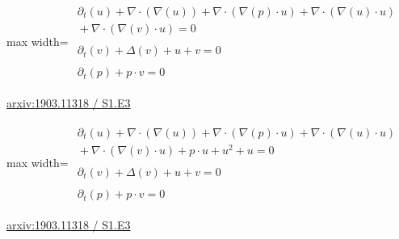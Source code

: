 \documentclass[10pt,a4paper]{article}
\begin{document}
\begin{minipage}{\linewidth}
\begin{center}\begin{adjustbox}{max width=\linewidth}$\displaystyle\begin{gathered}\begin{gathered}\partial_{t}(u)+\nabla\cdot(\nabla(u))+\nabla\cdot(\nabla(p)\cdot u)+\nabla\cdot(\nabla(u)\cdot u)\\[-1pt]{}+\nabla\cdot(\nabla(v)\cdot u)=0\end{gathered}\\[5pt]\begin{gathered}\partial_{t}(v)+\Delta(v)+u+v=0\end{gathered}\\[5pt]\begin{gathered}\partial_{t}(p)+p\cdot v=0\end{gathered}\end{gathered}$\end{adjustbox}\end{center}
{\small \href{https://arxiv.org/html/1903.11318#S1.E3}{arxiv:1903.11318 / S1.E3}}\par
\end{minipage}\par\vspace{7mm}

\begin{minipage}{\linewidth}
\begin{center}\begin{adjustbox}{max width=\linewidth}$\displaystyle\begin{gathered}\begin{gathered}\partial_{t}(u)+\nabla\cdot(\nabla(u))+\nabla\cdot(\nabla(p)\cdot u)+\nabla\cdot(\nabla(u)\cdot u)\\[-1pt]{}+\nabla\cdot(\nabla(v)\cdot u)+p\cdot u+u^{2}+u=0\end{gathered}\\[5pt]\begin{gathered}\partial_{t}(v)+\Delta(v)+u+v=0\end{gathered}\\[5pt]\begin{gathered}\partial_{t}(p)+p\cdot v=0\end{gathered}\end{gathered}$\end{adjustbox}\end{center}
{\small \href{https://arxiv.org/html/1903.11318#S1.E3}{arxiv:1903.11318 / S1.E3}}\par
\end{minipage}\par\vspace{7mm}
\end{document}
